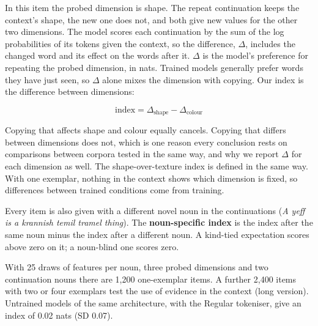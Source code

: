 In this item the probed dimension is shape. The repeat continuation keeps the context's shape, the new one does not, and both give new values for the other two dimensions. The model scores each continuation by the sum of the log probabilities of its tokens given the context, so the difference, $\Delta$, includes the changed word and its effect on the words after it. $\Delta$ is the model's preference for repeating the probed dimension, in nats. Trained models generally prefer words they have just seen, so $\Delta$ alone mixes the dimension with copying. Our index is the difference between dimensions:

\begin{equation*}
\text{index} = \Delta_{\text{shape}} - \Delta_{\text{colour}}
\end{equation*}

Copying that affects shape and colour equally cancels. Copying that differs between dimensions does not, which is one reason every conclusion rests on comparisons between corpora tested in the same way, and why we report $\Delta$ for each dimension as well. The shape-over-texture index is defined in the same way. With one exemplar, nothing in the context shows which dimension is fixed, so differences between trained conditions come from training.

Every item is also given with a different novel noun in the continuations (\emph{A yeff is a krannish temil tramel thing}). The \textbf{noun-specific index} is the index after the same noun minus the index after a different noun. A kind-tied expectation scores above zero on it; a noun-blind one scores zero.

With 25 draws of features per noun, three probed dimensions and two continuation nouns there are 1,200 one-exemplar items. A further 2,400 items with two or four exemplars test the use of evidence in the context (long version). Untrained models of the same architecture, with the Regular tokeniser, give an index of 0.02 nats (SD 0.07).


